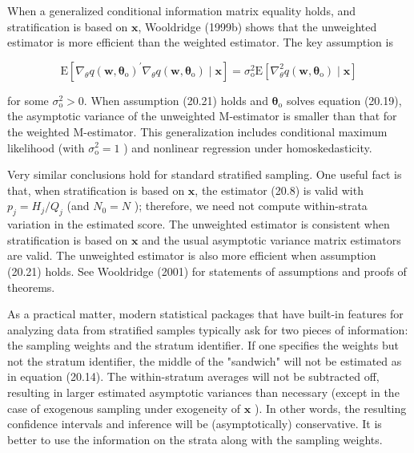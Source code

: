 \documentclass[10pt]{article}
\begin{document}
When a generalized conditional information matrix equality holds, and stratification is based on $\mathbf{x}$, Wooldridge (1999b) shows that the unweighted estimator is more efficient than the weighted estimator. The key assumption is


\begin{equation*}
\mathrm{E}\left[\nabla_{\theta} q\left(\mathbf{w}, \boldsymbol{\theta}_{\mathrm{o}}\right)^{\prime} \nabla_{\theta} q\left(\mathbf{w}, \boldsymbol{\theta}_{\mathrm{o}}\right) \mid \mathbf{x}\right]=\sigma_{\mathrm{o}}^{2} \mathrm{E}\left[\nabla_{\theta}^{2} q\left(\mathbf{w}, \boldsymbol{\theta}_{\mathrm{o}}\right) \mid \mathbf{x}\right] \tag{20.21}
\end{equation*}


for some $\sigma_{\mathrm{o}}^{2}>0$. When assumption (20.21) holds and $\boldsymbol{\theta}_{\mathrm{o}}$ solves equation (20.19), the asymptotic variance of the unweighted M-estimator is smaller than that for the weighted M-estimator. This generalization includes conditional maximum likelihood (with $\sigma_{\mathrm{o}}^{2}=1$ ) and nonlinear regression under homoskedasticity.

Very similar conclusions hold for standard stratified sampling. One useful fact is that, when stratification is based on $\mathbf{x}$, the estimator (20.8) is valid with $p_{j}=H_{j} / Q_{j}$ (and $N_{0}=N$ ); therefore, we need not compute within-strata variation in the estimated score. The unweighted estimator is consistent when stratification is based on $\mathbf{x}$ and the usual asymptotic variance matrix estimators are valid. The unweighted estimator is also more efficient when assumption (20.21) holds. See Wooldridge (2001) for statements of assumptions and proofs of theorems.

As a practical matter, modern statistical packages that have built-in features for analyzing data from stratified samples typically ask for two pieces of information: the sampling weights and the stratum identifier. If one specifies the weights but not the stratum identifier, the middle of the "sandwich" will not be estimated as in equation (20.14). The within-stratum averages will not be subtracted off, resulting in larger estimated asymptotic variances than necessary (except in the case of exogenous sampling under exogeneity of $\mathbf{x}$ ). In other words, the resulting confidence intervals and inference will be (asymptotically) conservative. It is better to use the information on the strata along with the sampling weights.
\end{document}

